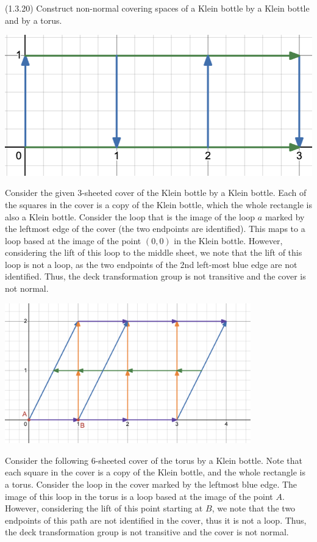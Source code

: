 \documentclass[12pt]{article}
\begin{document}
\begin{problem}{2}
    (1.3.20) Construct non-normal covering spaces of a Klein bottle by a Klein bottle and by a torus. 
\end{problem}

\begin{solution}
    \bbni
    \begin{center}
        \includegraphics{assets/hwk6_kleincover.png}
    \end{center}
    Consider the given $3$-sheeted cover of the Klein bottle by a Klein bottle. Each of the squares in the cover is a copy of the Klein bottle, which the whole rectangle is also a Klein bottle. Consider the loop that is the image of the loop $a$ marked by the leftmost edge of the cover (the two endpoints are identified). This maps to a loop based at the image of the point $(0, 0)$ in the Klein bottle. However, considering the lift of this loop to the middle sheet, we note that the lift of this loop is not a loop, as the two endpoints of the 2nd left-most blue edge are not identified. Thus, the deck transformation group is not transitive and the cover is not normal. \bbni
    \begin{center}
        \includegraphics[width=0.8\textwidth]{assets/hwk6_toruscover.png}
    \end{center}
    Consider the following $6$-sheeted cover of the torus by a Klein bottle. Note that each square in the cover is a copy of the Klein bottle, and the whole rectangle is a torus. Consider the loop in the cover marked by the leftmost blue edge. The image of this loop in the torus is a loop based at the image of the point $A$. However, considering the lift of this point starting at $B$, we note that the two endpoints of this path are not identified in the cover, thus it is not a loop. Thus, the deck transformation group is not transitive and the cover is not normal.
\end{solution}
\newpage
\end{document}
